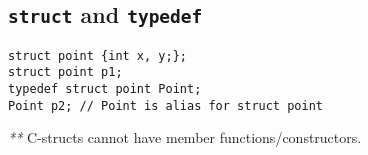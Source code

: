 \subsection*{\texttt{struct} and \texttt{typedef}}
\begin{verbatim}
struct point {int x, y;};
struct point p1;
typedef struct point Point;
Point p2; // Point is alias for struct point
\end{verbatim}
\vspace*{-1.25\baselineskip}

\emph{**} C-structs cannot have member functions/constructors.\\